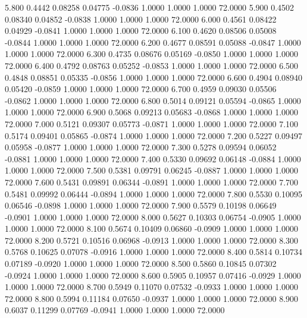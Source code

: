    5.800   0.4442   0.08258   0.04775  -0.0836   1.0000   1.0000   1.0000  72.0000
   5.900   0.4502   0.08340   0.04852  -0.0838   1.0000   1.0000   1.0000  72.0000
   6.000   0.4561   0.08422   0.04929  -0.0841   1.0000   1.0000   1.0000  72.0000
   6.100   0.4620   0.08506   0.05008  -0.0844   1.0000   1.0000   1.0000  72.0000
   6.200   0.4677   0.08591   0.05088  -0.0847   1.0000   1.0000   1.0000  72.0000
   6.300   0.4735   0.08676   0.05169  -0.0850   1.0000   1.0000   1.0000  72.0000
   6.400   0.4792   0.08763   0.05252  -0.0853   1.0000   1.0000   1.0000  72.0000
   6.500   0.4848   0.08851   0.05335  -0.0856   1.0000   1.0000   1.0000  72.0000
   6.600   0.4904   0.08940   0.05420  -0.0859   1.0000   1.0000   1.0000  72.0000
   6.700   0.4959   0.09030   0.05506  -0.0862   1.0000   1.0000   1.0000  72.0000
   6.800   0.5014   0.09121   0.05594  -0.0865   1.0000   1.0000   1.0000  72.0000
   6.900   0.5068   0.09213   0.05683  -0.0868   1.0000   1.0000   1.0000  72.0000
   7.000   0.5121   0.09307   0.05773  -0.0871   1.0000   1.0000   1.0000  72.0000
   7.100   0.5174   0.09401   0.05865  -0.0874   1.0000   1.0000   1.0000  72.0000
   7.200   0.5227   0.09497   0.05958  -0.0877   1.0000   1.0000   1.0000  72.0000
   7.300   0.5278   0.09594   0.06052  -0.0881   1.0000   1.0000   1.0000  72.0000
   7.400   0.5330   0.09692   0.06148  -0.0884   1.0000   1.0000   1.0000  72.0000
   7.500   0.5381   0.09791   0.06245  -0.0887   1.0000   1.0000   1.0000  72.0000
   7.600   0.5431   0.09891   0.06344  -0.0891   1.0000   1.0000   1.0000  72.0000
   7.700   0.5481   0.09992   0.06444  -0.0894   1.0000   1.0000   1.0000  72.0000
   7.800   0.5530   0.10095   0.06546  -0.0898   1.0000   1.0000   1.0000  72.0000
   7.900   0.5579   0.10198   0.06649  -0.0901   1.0000   1.0000   1.0000  72.0000
   8.000   0.5627   0.10303   0.06754  -0.0905   1.0000   1.0000   1.0000  72.0000
   8.100   0.5674   0.10409   0.06860  -0.0909   1.0000   1.0000   1.0000  72.0000
   8.200   0.5721   0.10516   0.06968  -0.0913   1.0000   1.0000   1.0000  72.0000
   8.300   0.5768   0.10625   0.07078  -0.0916   1.0000   1.0000   1.0000  72.0000
   8.400   0.5814   0.10734   0.07189  -0.0920   1.0000   1.0000   1.0000  72.0000
   8.500   0.5860   0.10845   0.07302  -0.0924   1.0000   1.0000   1.0000  72.0000
   8.600   0.5905   0.10957   0.07416  -0.0929   1.0000   1.0000   1.0000  72.0000
   8.700   0.5949   0.11070   0.07532  -0.0933   1.0000   1.0000   1.0000  72.0000
   8.800   0.5994   0.11184   0.07650  -0.0937   1.0000   1.0000   1.0000  72.0000
   8.900   0.6037   0.11299   0.07769  -0.0941   1.0000   1.0000   1.0000  72.0000
